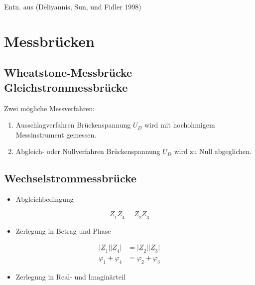 \documentclass[
  ngerman,
  letterpaper,
]{scrbook}
\providecommand{\tightlist}{%
  \setlength{\itemsep}{0pt}\setlength{\parskip}{0pt}}
\begin{document}
Entn. aus (Deliyannis, Sun, und Fidler 1998)

\section{Messbrücken}\label{messbruxfccken}

\subsection{Wheatstone-Messbrücke --
Gleichstrommessbrücke}\label{wheatstone-messbruxfccke-gleichstrommessbruxfccke}

Zwei mögliche Messverfahren:

\begin{enumerate}
\def\labelenumi{\arabic{enumi}.}
\item
  Ausschlagverfahren Brückenspannung \(U_D\) wird mit hochohmigem
  Messinstrument gemessen.
\item
  Abgleich- oder Nullverfahren Brückenspannung \(U_D\) wird zu Null
  abgeglichen.
\end{enumerate}

\subsection{Wechselstrommessbrücke}\label{wechselstrommessbruxfccke}

\begin{itemize}
\tightlist
\item
  Abgleichbedingung
\end{itemize}

\[
\underline{Z}_1 \underline{Z}_4 = \underline{Z}_2 \underline{Z}_3
\]

\begin{itemize}
\tightlist
\item
  Zerlegung in Betrag und Phase
\end{itemize}

\begin{align}
\vert\underline{Z}_1\vert \vert\underline{Z}_4\vert &= \vert\underline{Z}_2\vert \vert\underline{Z}_3\vert \\
\varphi_1 + \varphi_4 &= \varphi_2 + \varphi_3
\end{align}

\begin{itemize}
\tightlist
\item
  Zerlegung in Real- und Imaginärteil
\end{itemize}
\end{document}
